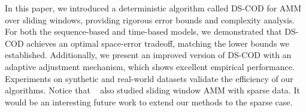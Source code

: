 In this paper, we introduced a deterministic algorithm called DS-COD for AMM over sliding windows, providing rigorous error bounds and complexity analysis. For both the sequence-based and time-based models, we demonstrated that DS-COD achieves an optimal space-error tradeoff, matching the lower bounds we established. Additionally, we present an improved version of DS-COD with an adaptive adjustment mechanism, which shows excellent empirical performance. Experiments on synthetic and real-world datasets validate the efficiency of our algorithms.
Notice that ~\citet{yao2024approximate} also studied sliding window AMM with sparse data. It would be an interesting future work to extend our methods to the sparse case.
